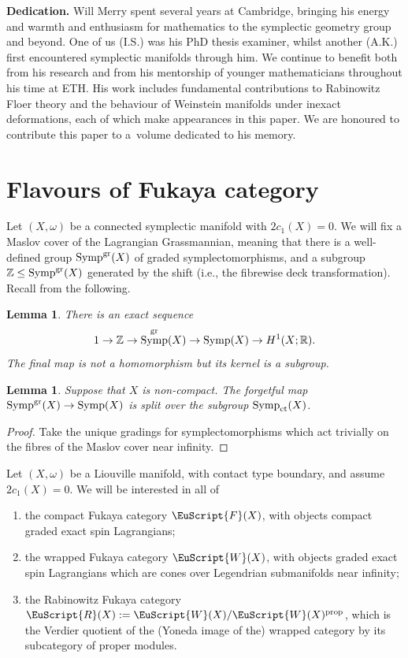 \documentclass[pdftex]{sigma}
\def\scrR{\EuScript{R}}
\newcommand{\scrF}{\EuScript{F}}
\def\scrW{\EuScript{W}}
\DeclareMathOperator{\Symp}{Symp}
\def\bZ{\mathbb{Z}}
\def\bR{\mathbb{R}}
\newtheorem{lem}[thm]{Lemma}
\theoremstyle{definition}
\numberwithin{equation}{section}
\begin{document}
\textbf{Dedication.}
 Will Merry spent several years at Cambridge, bringing his energy and warmth and enthusiasm for mathematics to the symplectic geometry group and beyond. One of us (I.S.) was his PhD thesis examiner, whilst another (A.K.) first encountered symplectic manifolds through him. We continue to benefit both from his research and from his mentorship of younger mathematicians throughout his time at ETH. His work includes fundamental contributions to Rabinowitz Floer theory and the behaviour of Weinstein manifolds under inexact deformations, each of which make appearances in this paper. We are honoured to contribute this paper to a~volume dedicated to his memory.

\section{Flavours of Fukaya category}\label{Sec:flavours}

Let $(X,\omega)$ be a connected symplectic manifold with $2c_1(X)=0$. We will fix a Maslov cover of the Lagrangian Grassmannian, meaning that there is a well-defined group $\Symp^{\rm gr}(X)$ of graded symplectomorphisms, and a subgroup $\bZ \leq \Symp^{\rm gr}(X)$ generated by the shift (i.e., the fibrewise deck transformation). Recall from \cite[Lemma~2.4]{Seidel:graded} the following.

\begin{lem}
There is an exact sequence
\[
1 \to \bZ \to \Symp^{\rm gr}(X) \to \Symp(X) \to H^1(X;\bR).
\]
The final map is not a homomorphism but its kernel is a subgroup.
\end{lem}

\begin{lem}\label{lem:forgetting-gradings-splits}
Suppose that $X$ is non-compact. The forgetful map $\Symp^{\rm gr}(X) \to \Symp(X)$ is split over the subgroup $\Symp_{\rm ct}(X)$.
\end{lem}

\begin{proof} Take the unique gradings for symplectomorphisms which act trivially on the fibres of the Maslov cover near infinity.
\end{proof}

Let $(X,\omega)$ be a Liouville manifold, with contact type boundary, and assume $2c_1(X)=0$. We will be interested in all of
\begin{enumerate}\itemsep=0pt
\item[(1)] the compact Fukaya category $\scrF(X)$, with objects compact graded exact spin Lagrangians;
\item[(2)] the wrapped Fukaya category $\scrW(X)$, with objects graded exact spin Lagrangians which are cones over Legendrian submanifolds near infinity;
\item[(3)] the Rabinowitz Fukaya category $\scrR(X) := \scrW(X) / \scrW(X)^{\rm prop}$, which is the Verdier quotient of the (Yoneda image of the) wrapped category by its subcategory of proper modules.
\end{enumerate}
\end{document}
